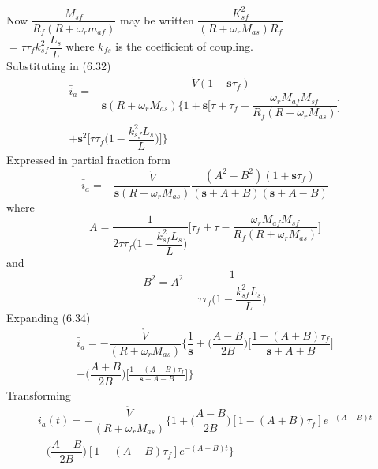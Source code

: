 \documentclass[a4paper,numbers=noenddot,12pt]{scrbook}
\begin{document}
        \begingroup
        \setlength{\lineskip}{2pt} 
        \noindent Now $\dfrac{M_{sf}}{R_f(R + \omega_r m_{af})}$ may be written $\dfrac{K_{sf}^2}{(R + \omega_r M_{as}) R_f}$ \\
        \phantom{Now }$= \tau \tau_f k_{sf}^2 \dfrac{L_s}{L}$ where $k_{fs}$ is the coefficient of coupling.\\

    \endgroup
    \noindent Substituting in (6.32)
    \begin{multline}
        \bar i_a = - \dfrac{\mathring V(1-\textbf{s}\tau_f)}{\textbf{s}(R + \omega_r M_{as}) \bigg\{1 + \textbf{s} \bigg[\tau + \tau_f - \dfrac{\omega_r M_{af} M_{sf}}{R_f (R + \omega_r M_{as})} \bigg]} \\ %
        + \textbf{s}^2 \bigg[\tau \tau_f \bigg(1 - \dfrac{k_{sf}^2 L_s}{L}\bigg)\bigg]\bigg\}
        \label{}
    \end{multline}
    Expressed in partial fraction form
    \begin{equation}
        \bar i_a = - \dfrac{\mathring V}{\textbf{s}(R + \omega_r M_{as})} \dfrac{(A^2 - B^2)(1 + \mathbf s \tau_f)}{(\mathbf s + A + B)(\textbf{s} + A - B)} %
        \label{}
    \end{equation}
    where
    \begin{equation}
        A = \dfrac{1}{2 \tau \tau_f \bigg(1 - \dfrac{k_{sf}^2 L_s}{L}\bigg)} \bigg[\tau_f + \tau - \dfrac{\omega_r M_{af} M_{sf}}{R_f (R + \omega_r M_{as})}\bigg]
        \label{}
    \end{equation}
    and
    \begin{equation}
        B^2 = A^2 - \dfrac{1}{\tau \tau_f \bigg(1 - \dfrac{k_{sf}^2 L_s}{L}\bigg)}
        \label{}
    \end{equation}
    Expanding (6.34)
    \begin{multline}
        \bar i_a = - \dfrac{\mathring V}{(R + \omega_r M_{as})}\bigg\{\dfrac{1}{\mathbf{s}} + \big(\dfrac{A-B}{2B}\bigg) \bigg[\dfrac{1 - (A + B)\tau_f}{\mathbf{s} + A + B}\bigg] \\ %
        - \bigg(\dfrac{A+B}{2B}\bigg)\bigg[\frac{1 - (A - B)\tau_f}{\mathbf{s}+A-B}\bigg]\bigg\} 
        \label{}
    \end{multline}
    Transforming
    \begin{multline}
        \bar i_a(t) = - \dfrac{\mathring V}{(R + \omega_r M_{as})} \bigg\{1 + \bigg( \dfrac{A-B}{2B}\bigg) [1 - (A + B) \tau_f]e^{-(A-B)t} \\%
        - \bigg(\dfrac{A - B}{2B}\bigg)[1 - (A - B)\tau_f]e^{-(A - B)t}\bigg\}
        \label{}
    \end{multline}
\end{document}
